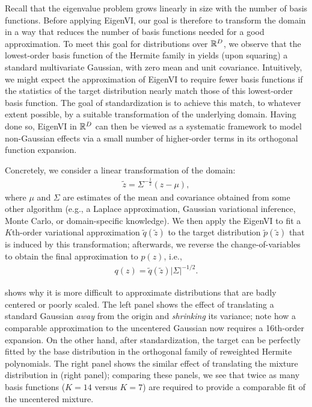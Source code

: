 Recall that the eigenvalue problem grows linearly in size with the number of basis functions. Before applying EigenVI, our goal is therefore to transform the domain in a way that reduces the number of basis functions needed for a good approximation.
To meet this goal for distributions over $\mathbb{R}^D$, we observe that the lowest-order basis function of the Hermite family in  yields (upon squaring) a standard multivariate Gaussian, with zero mean and unit covariance.
Intuitively, we might expect the approximation of EigenVI to require fewer basis functions if the statistics of the target distribution nearly match those of this lowest-order basis function. The goal of standardization is to achieve this match, to whatever extent possible, by a suitable transformation of the underlying domain. Having done so, EigenVI in $\mathbb{R}^D$ can then be viewed as
a systematic framework to model non-Gaussian effects via a small number of higher-order terms in its orthogonal function expansion.

Concretely, we consider a linear transformation  of the domain:
\begin{align}
    \tilde{z} =
    \Sigma^{-\frac{1}{2}}(z\!-\!\mu),
\end{align}
where $\mu$ and $\Sigma$ are  estimates of the mean and covariance
obtained
from some other algorithm
(e.g., a Laplace approximation,  Gaussian variational inference,  Monte Carlo, or domain-specific
knowledge).
We then apply the EigenVI to fit a $K$th-order variational approximation $\tilde q(\tilde z)$
to the target distribution $\tilde{p}(\tilde{z})$ that is induced by this transformation;
afterwards, we reverse the change-of-variables to obtain the final approximation to $p(z)$, i.e.,
\begin{align}
q(z) = \tilde{q}(\tilde{z})|\Sigma|^{-1/2}.
\end{align}

 shows why it is more difficult to approximate distributions that are
badly centered or poorly scaled. The left panel shows the effect of translating a standard Gaussian
\textit{away} from the origin and \textit{shrinking} its variance; note how a comparable
approximation to the uncentered Gaussian now requires a 16th-order expansion.
On the other hand, after standardization, the target
can be perfectly fitted by the base distribution
in the orthogonal family of reweighted Hermite polynomials.
%
The right panel shows
the similar effect of translating the mixture distribution in  (right panel);
comparing these panels, we see that twice as many basis functions ($K\!=\!14$ versus $K\!=\!7$)
are required to provide a comparable fit of the uncentered mixture.


